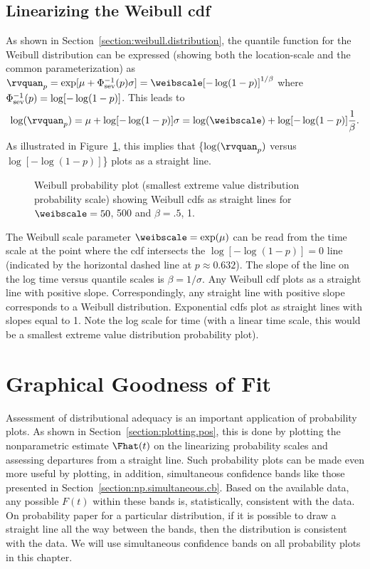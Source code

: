 \subsection{Linearizing the Weibull cdf}
\label{section:probplot.weibull}
As shown in Section~\ref{section:weibull.distribution},
the quantile function for the Weibull distribution 
can be expressed (showing both the location-scale and the 
common parameterization) as
$\rvquan_{p}=\exp[\mu  + \Phi_{{\rm sev}}^{-1}(p) \sigma ]=
	\weibscale[-\log(1-p)]^{1/\beta}$
where $\Phi^{-1}_{{\rm sev}}(p)=\log[-\log(1-p)]$.
This leads to
\begin{displaymath}
\log(\rvquan_{p})= \mu  + \log[-\log(1-p)] \sigma=
	\log(\weibscale) + \log[-\log(1-p)]\frac{1}{\beta}.
\end{displaymath}
As illustrated in Figure~\ref{figure:loglinear.weibull.ps}, this implies
that \{$\log(\rvquan_{p})$ 
versus $ \log[-\log(1-p)]$\} plots as a straight line. 
\begin{figure}
\caption{Weibull probability plot (smallest extreme value distribution 
probability scale) showing Weibull cdfs as straight lines for
$\weibscale=50$, 500 and $\beta=.5$, 1.}
\label{figure:loglinear.weibull.ps}
\end{figure}
The Weibull scale parameter $\weibscale=\exp(\mu)$ can be read from
the time scale at the point where the cdf intersects the
$\log[-\log(1-p)]=0$ line (indicated by the horizontal dashed line at
$p \approx 0.632$).  The slope of the line on the log time versus
quantile scales is $\beta=1/\sigma$.  Any Weibull cdf plots as a
straight line with positive slope.  Correspondingly, any straight line
with positive slope corresponds to a Weibull distribution. Exponential
cdfs plot as straight lines with slopes equal to 1. Note the log scale
for time (with a linear time scale, this would be a smallest extreme
value distribution probability plot).
%
%
\section{Graphical Goodness of Fit}
\label{section:graphical.gof}
Assessment of distributional adequacy is an important application of
probability plots. As shown in Section~\ref{section:plotting.pos},
this is done by plotting the nonparametric estimate $\Fhat(t)$ on the
linearizing probability scales and assessing departures from a
straight line.  Such probability plots can be made even more useful by
plotting, in addition, simultaneous confidence bands like those
presented in Section~\ref{section:np.simultaneous.cb}. Based on the
available data, any possible $F(t)$ within these bands is,
statistically, consistent with the data. On probability paper for a
particular distribution, if it is possible to draw a straight line all
the way between the bands, then the distribution is consistent with
the data. We will use simultaneous confidence bands on all probability
plots in this chapter.
